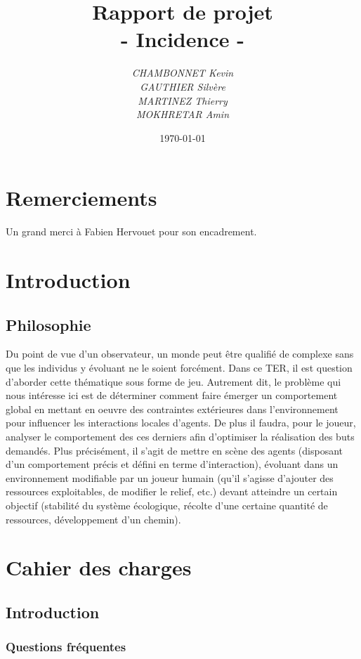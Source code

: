 \documentclass[a4paper]{memoir}
\title{\textbf{Rapport de projet}\\- \Huge{Incidence} -}
\author{\emph{CHAMBONNET Kevin}\\\emph{GAUTHIER Silvère}\\\emph{MARTINEZ Thierry}\\\emph{MOKHRETAR Amin}}
\date{\today}
\begin{document}
	\maketitle
	\newpage
	\tableofcontents

	\chapter{Remerciements}

		Un grand merci à Fabien Hervouet pour son encadrement.

	\chapter{Introduction}
	
		\section{Philosophie}
			Du point de vue d’un observateur, un monde peut être qualifié de complexe sans que les individus y évoluant ne le soient forcément. Dans ce TER, il est question d’aborder cette thématique sous forme de jeu. Autrement dit, le problème qui nous intéresse ici est de déterminer comment faire émerger un comportement global en mettant en oeuvre des contraintes extérieures dans l’environnement pour influencer les interactions locales d’agents. De plus il faudra, pour le joueur, analyser le comportement des ces derniers afin d’optimiser la réalisation des buts demandés. Plus précisément, il s’agit de mettre en scène des agents (disposant d’un comportement précis et défini en terme d’interaction), évoluant dans un environnement modifiable par un joueur humain (qu’il s’agisse d’ajouter des ressources exploitables, de modifier le relief, etc.) devant atteindre un certain objectif (stabilité du système écologique, récolte d’une certaine quantité de ressources, développement d’un chemin).
	
	\chapter{Cahier des charges}
	
		\section{Introduction}
		
			\subsection{Questions fréquentes}
\end{document}
